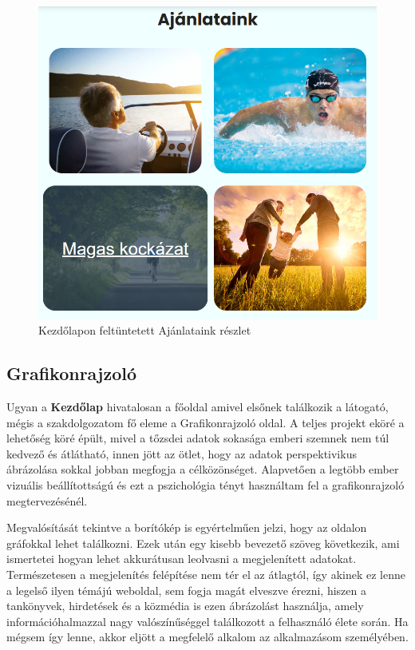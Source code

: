 \begin{figure}[h]
\centering
\includegraphics[scale=0.4]{images/home.png}
\caption{Kezdőlapon feltüntetett Ajánlataink részlet}
\end{figure}

\subsection{Grafikonrajzoló}

Ugyan a \textbf{Kezdőlap} hivatalosan a főoldal amivel elsőnek találkozik a látogató, mégis a szakdolgozatom fő eleme a Grafikonrajzoló oldal. A teljes projekt eköré a lehetőség köré épült, mivel a tőzsdei adatok sokasága emberi szemnek nem túl kedvező és átlátható, innen jött az ötlet, hogy az adatok perspektivikus ábrázolása sokkal jobban megfogja a célközönséget. Alapvetően a legtöbb ember vizuális beállítottságú és ezt a pszichológia tényt használtam fel a grafikonrajzoló megtervezésénél.

	Megvalósítását tekintve a borítókép is egyértelműen jelzi, hogy az oldalon gráfokkal lehet találkozni. Ezek után egy kisebb bevezető szöveg következik, ami ismertetei hogyan lehet akkurátusan leolvasni a megjelenített adatokat. Természetesen a megjelenítés felépítése nem tér el az átlagtól, így akinek ez lenne a legelső ilyen témájú weboldal, sem fogja magát elveszve érezni, hiszen a tankönyvek, hirdetések és a közmédia is ezen ábrázolást használja, amely információhalmazzal nagy valószínűséggel találkozott a felhasználó élete során. Ha mégsem így lenne, akkor eljött a megfelelő alkalom az alkalmazásom személyében.

